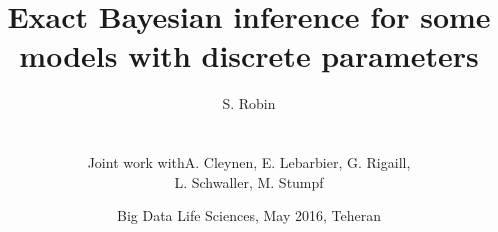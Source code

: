 \documentclass[10pt]{beamer}
\newcommand{\fignet}{/home/robin/Bureau/RECHERCHE/RESEAUX/EXPOSES/FIGURES}
\begin{document}

\title[Exact inference with discrete parameters]{Exact Bayesian inference for some models with discrete parameters}

\author[S. Robin]{S. Robin \\ ~\\
  \begin{tabular}{ll}
    Joint work with & A. Cleynen, E. Lebarbier, G. Rigaill, \\
    & L. Schwaller, M. Stumpf
  \end{tabular}
  }


\date[May 2016, Teheran]{Big Data Life Sciences, May 2016, Teheran}

\maketitle

\end{document}
